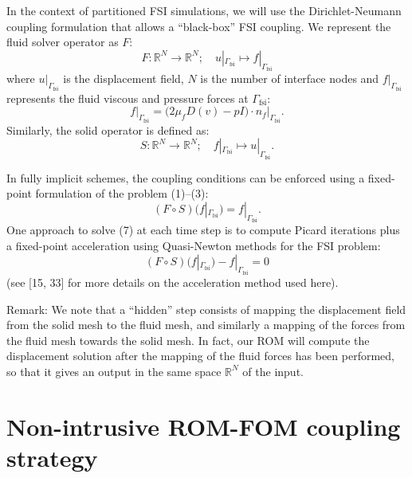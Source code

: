 \documentclass[11pt]{article}
\begin{document}
In the context of partitioned FSI simulations, we will use the Dirichlet-Neumann coupling formulation that allows a ``black-box'' FSI coupling. We represent the fluid solver operator as $F$:
\begin{equation}
\tag{4}
F : \mathbb{R}^{N} \to \mathbb{R}^{N};\quad u|_{\Gamma_{\mathrm{fsi}}} \mapsto f|_{\Gamma_{\mathrm{fsi}}}
\end{equation}
where $u|_{\Gamma_{\mathrm{fsi}}}$ is the displacement field, $N$ is the number of interface nodes and $f|_{\Gamma_{\mathrm{fsi}}}$ represents the fluid viscous and pressure forces at $\Gamma_{\mathrm{fsi}}$:
\begin{equation}
\tag{5}
f|_{\Gamma_{\mathrm{fsi}}} = \big(2\mu_f D(v) - pI\big)\cdot n_f\big|_{\Gamma_{\mathrm{fsi}}}.
\end{equation}
Similarly, the solid operator is defined as:
\begin{equation}
\tag{6}
S : \mathbb{R}^{N} \to \mathbb{R}^{N};\quad f|_{\Gamma_{\mathrm{fsi}}} \mapsto u|_{\Gamma_{\mathrm{fsi}}}.
\end{equation}

In fully implicit schemes, the coupling conditions can be enforced using a fixed-point formulation of the problem (1)--(3):
\begin{equation}
\tag{7}
(F \circ S)\big(f|_{\Gamma_{\mathrm{fsi}}}\big) = f|_{\Gamma_{\mathrm{fsi}}}.
\end{equation}
One approach to solve (7) at each time step is to compute Picard iterations plus a fixed-point acceleration using Quasi-Newton methods for the FSI problem:
\begin{equation}
\tag{8}
(F \circ S)\big(f|_{\Gamma_{\mathrm{fsi}}}\big) - f|_{\Gamma_{\mathrm{fsi}}} = 0
\end{equation}
(see [15, 33] for more details on the acceleration method used here).

Remark: We note that a ``hidden'' step consists of mapping the displacement field from the solid mesh to the fluid mesh, and similarly a mapping of the forces from the fluid mesh towards the solid mesh. In fact, our ROM will compute the displacement solution after the mapping of the fluid forces has been performed, so that it gives an output in the same space $\mathbb{R}^{N}$ of the input.


\section{Non-intrusive ROM-FOM coupling strategy}
\end{document}
